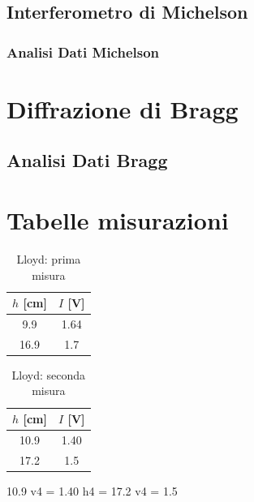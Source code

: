 \documentclass[letterpaper,12pt]{article}
\begin{document}
\subsection{Interferometro di Michelson}


\subsubsection{Analisi Dati Michelson}


\section{Diffrazione di Bragg}

\subsection{Analisi Dati Bragg}

\newpage
\section{Tabelle misurazioni}

\begin{table}[h!]
    \centering
    \caption{Lloyd: prima misura}
    \label{tab:lloyd1}
    \begin{tabular}{|c|c|}
        \hline
        $h$ [cm] & $I$ [V]\\
        \hline
        9.9 & 1.64 \\
        16.9 & 1.7 \\
        \hline
    \end{tabular}
\end{table}
    
\begin{table}[h!]
    \centering
    \caption{Lloyd: seconda misura}
    \label{tab:lloyd2}
    \begin{tabular}{|c|c|}
        \hline
        $h$ [cm] & $I$ [V]\\
        \hline
        10.9 & 1.40 \\
        17.2 & 1.5 \\
        \hline
    \end{tabular}
\end{table}

10.9
v4 = 1.40
h4 = 17.2
v4 = 1.5
\end{document}
